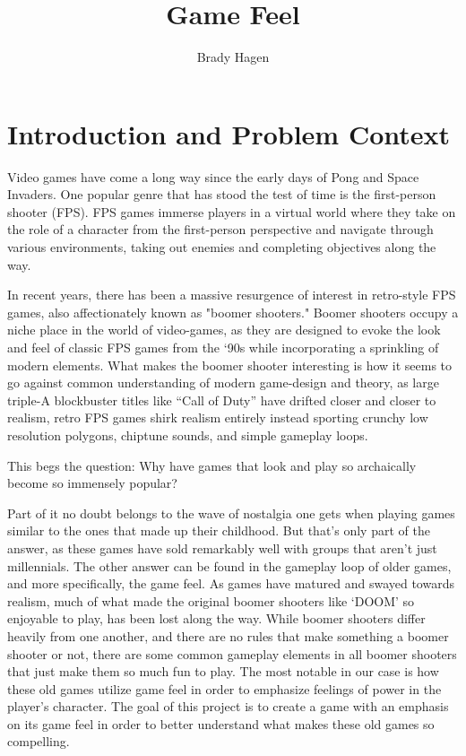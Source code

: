 \documentclass[10pt,twocolumn]{article}
\title{Game Feel}
\author{Brady Hagen}
\affiliation{Occidental College}
\begin{document}
\maketitle

\section{Introduction and Problem Context}
Video games have come a long way since the early days of Pong and Space Invaders. One popular genre that has stood the test of time is the first-person shooter (FPS). FPS games immerse players in a virtual world where they take on the role of a character from the first-person perspective and navigate through various environments, taking out enemies and completing objectives along the way.

In recent years, there has been a massive resurgence of interest in retro-style FPS games, also affectionately known as "boomer shooters." Boomer shooters occupy a niche place in the world of video-games, as they are designed to evoke the look and feel of classic FPS games from the ‘90s while incorporating a sprinkling of modern elements. What makes the boomer shooter interesting is how it seems to go against common understanding of modern game-design and theory, as large triple-A blockbuster titles like “Call of Duty” have drifted closer and closer to realism, retro FPS games shirk realism entirely instead sporting crunchy low resolution polygons, chiptune sounds, and simple gameplay loops.

This begs the question: Why have games that look and play so archaically become so immensely popular?

Part of it no doubt belongs to the wave of nostalgia one gets when playing games similar to the ones that made up their childhood. But that’s only part of the answer, as these games have sold remarkably well with groups that aren’t just millennials\cite{InverseBoomerShooter}.
The other answer can be found in the gameplay loop of older games, and more specifically, the game feel. As games have matured and swayed towards realism, much of what made the original boomer shooters like ‘DOOM’ so enjoyable to play, has been lost along the way. 
While boomer shooters differ heavily from one another, and there are no rules that make something a boomer shooter or not, there are some common gameplay elements in all boomer shooters that just make them so much fun to play. 
The most notable in our case is how these old games utilize game feel in order to emphasize feelings of power in the player’s character.
The goal of this project is to create a game with an emphasis on its game feel in order to better understand what makes these old games so compelling. 
\end{document}
